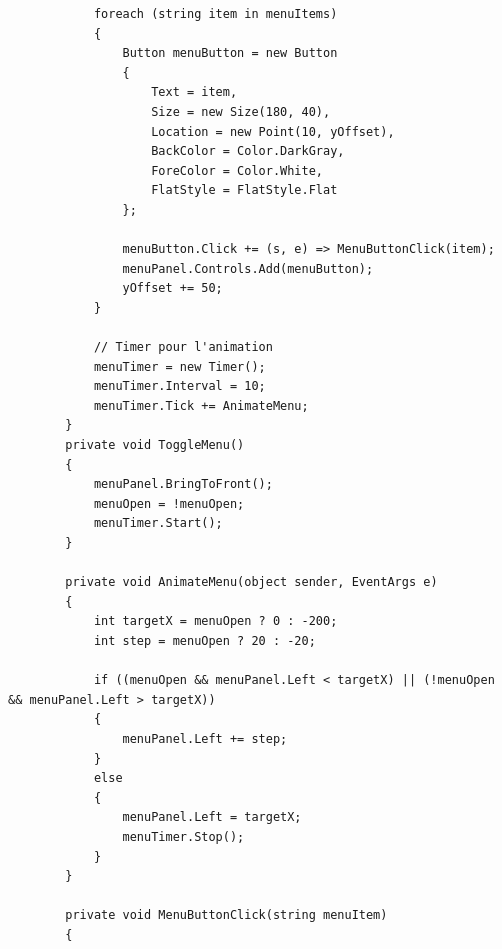 \documentclass[main.tex]{subfiles}
\begin{document}
\begin{lstlisting}
            foreach (string item in menuItems)
            {
                Button menuButton = new Button
                {
                    Text = item,
                    Size = new Size(180, 40),
                    Location = new Point(10, yOffset),
                    BackColor = Color.DarkGray,
                    ForeColor = Color.White,
                    FlatStyle = FlatStyle.Flat
                };

                menuButton.Click += (s, e) => MenuButtonClick(item);
                menuPanel.Controls.Add(menuButton);
                yOffset += 50;
            }

            // Timer pour l'animation
            menuTimer = new Timer();
            menuTimer.Interval = 10;
            menuTimer.Tick += AnimateMenu;
        }
        private void ToggleMenu()
        {
            menuPanel.BringToFront();
            menuOpen = !menuOpen;
            menuTimer.Start();
        }

        private void AnimateMenu(object sender, EventArgs e)
        {
            int targetX = menuOpen ? 0 : -200;
            int step = menuOpen ? 20 : -20;

            if ((menuOpen && menuPanel.Left < targetX) || (!menuOpen && menuPanel.Left > targetX))
            {
                menuPanel.Left += step;
            }
            else
            {
                menuPanel.Left = targetX;
                menuTimer.Stop();
            }
        }

        private void MenuButtonClick(string menuItem)
        {


\end{lstlisting}
\end{document}
